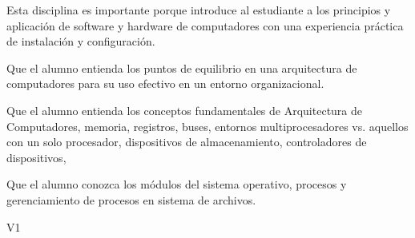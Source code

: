 \begin{syllabus}


\begin{justification}
Esta disciplina es importante porque introduce al estudiante a los principios y aplicación de software y hardware de computadores con una experiencia práctica de instalación y configuración.
\end{justification}

\begin{goals}
\item Que el alumno entienda los puntos de equilibrio en una arquitectura de computadores para su uso efectivo en un entorno organizacional.
\item Que el alumno entienda los conceptos fundamentales de Arquitectura de Computadores, memoria, registros, buses, entornos multiprocesadores vs. aquellos con un solo procesador, dispositivos de almacenamiento, controladores de dispositivos, 
\item Que el alumno conozca los módulos del sistema operativo, procesos y gerenciamiento de procesos en sistema de archivos.
\end{goals}

\begin{outcomes}{V1}
\end{outcomes}


\end{syllabus}
